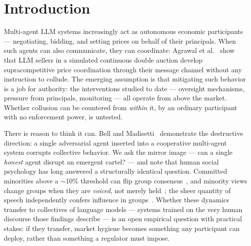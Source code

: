 \documentclass[acmsmall]{acmart}
\begin{document}


\maketitle

\section{Introduction}

Multi-agent LLM systems increasingly act as autonomous economic
participants --- negotiating, bidding, and setting prices on behalf of
their principals. When such agents can also communicate, they can
coordinate: Agrawal et al.~\cite{agrawal2025collusion} show that LLM
sellers in a simulated continuous double auction develop supracompetitive
price coordination through their message channel without any instruction
to collude. The emerging assumption is that mitigating such behavior is a
job for authority: the interventions studied to date --- oversight
mechanisms, pressure from principals, monitoring --- all operate from
above the market. Whether collusion can be countered from \emph{within}
it, by an ordinary participant with no enforcement power, is untested.

There is reason to think it can. Bell and
Madisetti~\cite{bell2026corruption} demonstrate the destructive direction:
a single adversarial agent inserted into a cooperative multi-agent system
corrupts collective behavior. We ask the mirror image --- can a single
\emph{honest} agent disrupt an emergent cartel? --- and note that human
social psychology has long answered a structurally identical question.
Committed minorities above a $\sim$10\% threshold can flip group
consensus~\cite{xie2011social}, and minority views change groups when they
are \emph{voiced}, not merely held~\cite{maier1952contribution}; the sheer
quantity of speech independently confers influence in
groups~\cite{jones2007babble}. Whether these dynamics transfer to
collectives of language models --- systems trained on the very human
discourse those findings describe --- is an open empirical question with
practical stakes: if they transfer, market hygiene becomes something any
participant can deploy, rather than something a regulator must impose.
\end{document}
